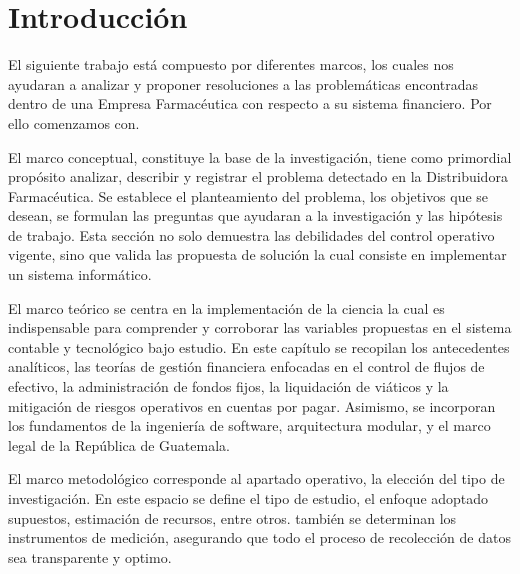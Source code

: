 
\section*{Introducción}
\vspace{0.5cm}

El siguiente trabajo está compuesto por diferentes marcos, los cuales
nos ayudaran a analizar y proponer resoluciones a las problemáticas
encontradas dentro de una Empresa Farmacéutica con respecto a su sistema
financiero. Por ello comenzamos con.

El marco conceptual, constituye la base de la investigación, tiene como
primordial propósito analizar, describir y registrar el problema
detectado en la Distribuidora Farmacéutica. Se establece el planteamiento del problema,
los objetivos que se desean, se formulan las preguntas que ayudaran a la
investigación y las hipótesis de trabajo. Esta sección no solo demuestra
las debilidades del control operativo vigente, sino que valida las
propuesta de solución la cual consiste en implementar un sistema
informático.

El marco teórico se centra en la implementación de la ciencia la cual es
indispensable para comprender y corroborar las variables propuestas en
el sistema contable y tecnológico bajo estudio. En este capítulo se
recopilan los antecedentes analíticos, las teorías de gestión financiera
enfocadas en el control de flujos de efectivo, la administración de
fondos fijos, la liquidación de viáticos y la mitigación de riesgos
operativos en cuentas por pagar. Asimismo, se incorporan los fundamentos
de la ingeniería de software, arquitectura modular, y el marco legal de
la República de Guatemala.

El marco metodológico corresponde al apartado operativo, la elección del
tipo de investigación. En este espacio se define el tipo de estudio, el
enfoque adoptado supuestos, estimación de recursos, entre otros. también
se determinan los instrumentos de medición, asegurando que todo el
proceso de recolección de datos sea transparente y optimo.